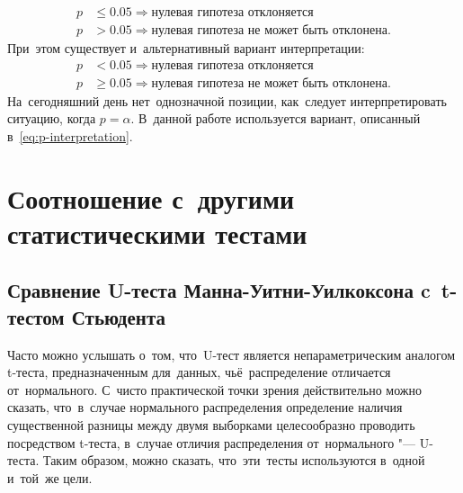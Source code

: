 \documentclass[]{scrreprt}
\begin{document}
\begin{equation}\label{eq:p-interpretation}
	\begin{aligned}
	p &\leq 0.05 \Rightarrow \text{нулевая гипотеза отклоняется}\\
	p &> 0.05 \Rightarrow \text{нулевая гипотеза не может быть отклонена}.
	\end{aligned}
\end{equation}
%
При~этом существует и~альтернативный вариант интерпретации:
%
\begin{equation}\label{eq:p-interpretation-2}
\begin{aligned}
p &< 0.05 \Rightarrow \text{нулевая гипотеза отклоняется}\\
p &\geq 0.05 \Rightarrow \text{нулевая гипотеза не может быть отклонена}.
\end{aligned}
\end{equation}
На~сегодняшний день нет~однозначной позиции, как~следует интерпретировать ситуацию, когда $p = \alpha$. В~данной работе используется вариант, описанный в~\ref{eq:p-interpretation}.

\section{Соотношение с~другими статистическими тестами}
\subsection{Сравнение U-теста Манна-Уитни-Уилкоксона c~t-тестом Стьюдента}
Часто можно услышать о~том, что~U-тест является непараметрическим аналогом t-теста, предназначенным для~данных, чьё~распределение отличается от~нормального. С~чисто практической точки зрения действительно можно сказать, что~в~случае нормального распределения определение наличия существенной разницы между двумя выборками целесообразно проводить посредством t-теста, в~случае отличия распределения от~нормального "--- U-теста. Таким образом, можно сказать, что~эти~тесты используются в~одной и~той~же цели.
\end{document}
